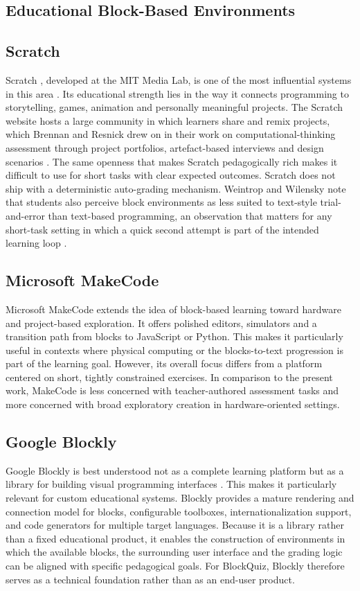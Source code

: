 \subsection{Educational Block-Based Environments}


\subsection*{Scratch}
Scratch \cite{scratch2026}, developed at the MIT Media Lab, is one of the most influential systems in this area \cite{resnick2009}.
Its educational strength lies in the way it connects programming
to storytelling, games, animation and personally meaningful projects.
The Scratch website hosts a large community in which learners share and remix projects, which Brennan and Resnick drew on in their work on computational-thinking assessment
through project portfolios, artefact-based interviews and design scenarios \cite{brennan2012}. The same openness that makes Scratch pedagogically rich makes it
difficult to use for short tasks with clear expected outcomes.
Scratch does not ship with a deterministic auto-grading mechanism.
Weintrop and Wilensky note that students also perceive block environments as less suited to text-style trial-and-error than text-based programming,
an observation that matters for any short-task setting in which a quick second attempt is part of the intended learning loop \cite{weintrop2015}.

\subsection*{Microsoft MakeCode}
Microsoft MakeCode \cite{makecode2026} extends the idea of block-based learning toward hardware and project-based exploration.
It offers polished editors, simulators and a transition path from blocks to JavaScript or Python.
This makes it particularly useful in contexts where physical computing or the blocks-to-text progression is part of the learning goal.
However, its overall focus differs from a platform centered on short, tightly constrained exercises.
In comparison to the present work, MakeCode is less concerned with teacher-authored assessment tasks and more concerned with broad exploratory creation in hardware-oriented settings.


\subsection*{Google Blockly}
Google Blockly is best understood not as a complete learning platform but as a library for building visual programming interfaces \cite{blockly}. This makes it particularly relevant for
custom educational systems. Blockly provides a mature rendering and connection model for blocks, configurable toolboxes, internationalization support, and code generators for multiple
target languages. Because it is a library rather than a fixed educational product, it enables the construction of environments in which the available blocks, the surrounding
user interface and the grading logic can be aligned with specific pedagogical goals. For BlockQuiz, Blockly therefore serves as a technical foundation rather than as an end-user product.

